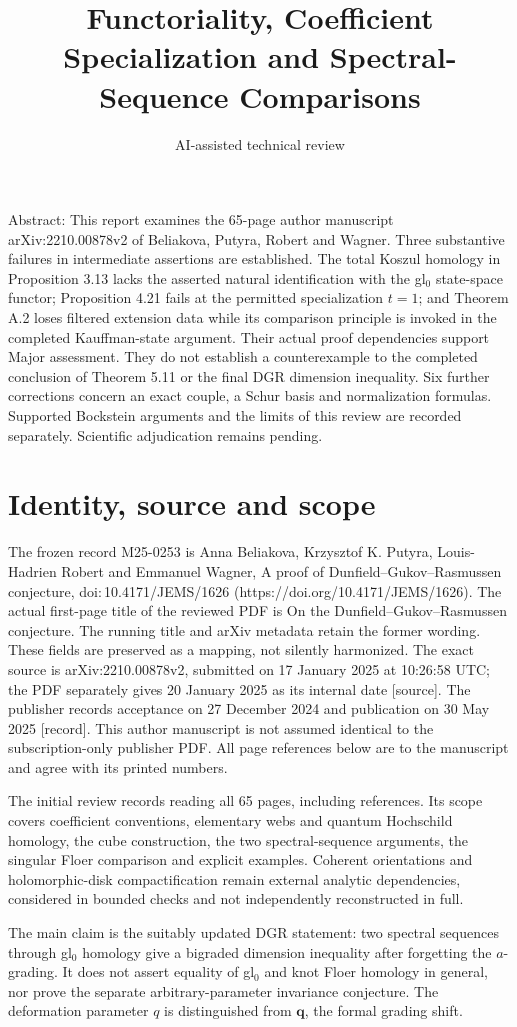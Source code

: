 \documentclass[10pt]{article}
\title{Functoriality, Coefficient Specialization and
Spectral-Sequence Comparisons}
\author{AI-assisted technical review}
\date{}
\begin{document}
\maketitle
Abstract: This report examines the 65-page author manuscript arXiv:2210.00878v2 of Beliakova, Putyra, Robert and Wagner. Three substantive failures in intermediate assertions are established. The total Koszul homology in Proposition 3.13 lacks the asserted natural identification with the gl\(_0\) state-space functor; Proposition 4.21 fails at the permitted specialization \(t=1\); and Theorem A.2 loses filtered extension data while its comparison principle is invoked in the completed Kauffman-state argument. Their actual proof dependencies support Major assessment. They do not establish a counterexample to the completed conclusion of Theorem 5.11 or the final DGR dimension inequality. Six further corrections concern an exact couple, a Schur basis and normalization formulas. Supported Bockstein arguments and the limits of this review are recorded separately. Scientific adjudication remains pending.\par
\section*{Identity, source and scope}
The frozen record M25-0253 is Anna Beliakova, Krzysztof K. Putyra, Louis-Hadrien Robert and Emmanuel Wagner, A proof of Dunfield–Gukov–Rasmussen conjecture, doi: 10.4171/JEMS/1626 (https://doi.org/10.4171/JEMS/1626). The actual first-page title of the reviewed PDF is On the Dunfield–Gukov–Rasmussen conjecture. The running title and arXiv metadata retain the former wording. These fields are preserved as a mapping, not silently harmonized. The exact source is arXiv:2210.00878v2, submitted on 17 January 2025 at 10:26:58 UTC; the PDF separately gives 20 January 2025 as its internal date [source]. The publisher records acceptance on 27 December 2024 and publication on 30 May 2025 [record]. This author manuscript is not assumed identical to the subscription-only publisher PDF. All page references below are to the manuscript and agree with its printed numbers.\par
The initial review records reading all 65 pages, including references. Its scope covers coefficient conventions, elementary webs and quantum Hochschild homology, the cube construction, the two spectral-sequence arguments, the singular Floer comparison and explicit examples. Coherent orientations and holomorphic-disk compactification remain external analytic dependencies, considered in bounded checks and not independently reconstructed in full.\par
The main claim is the suitably updated DGR statement: two spectral sequences through gl\(_0\) homology give a bigraded dimension inequality after forgetting the \(a\)-grading. It does not assert equality of gl\(_0\) and knot Floer homology in general, nor prove the separate arbitrary-parameter invariance conjecture. The deformation parameter \(q\) is distinguished from \(\mathbf q\), the formal grading shift.\par
\end{document}
